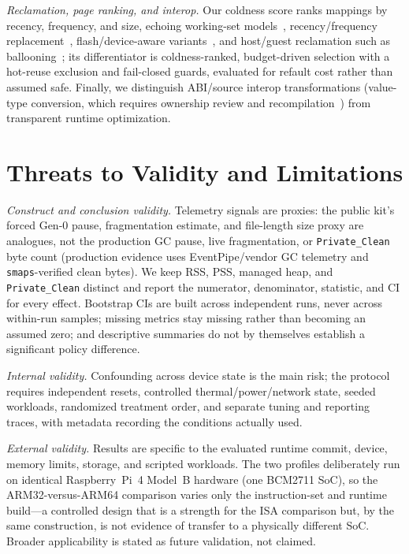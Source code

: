 \emph{Reclamation, page ranking, and interop.} Our coldness score ranks mappings
by recency, frequency, and size, echoing working-set
models~\cite{denning1968working}, recency/frequency
replacement~\cite{jiang2002lirs}, flash/device-aware
variants~\cite{park2006cflru}, and host/guest reclamation such as
ballooning~\cite{waldspurger2002esx}; its differentiator is coldness-ranked,
budget-driven selection with a hot-reuse exclusion and fail-closed guards,
evaluated for refault cost rather than assumed safe. Finally, we distinguish
ABI/source interop transformations (value-type conversion, which requires
ownership review and recompilation~\cite{xlang2018}) from transparent runtime
optimization.

\section{Threats to Validity and Limitations}
\label{sec:threats}
\label{sec:limitations}

\emph{Construct and conclusion validity.} Telemetry signals are proxies: the
public kit's forced Gen-0 pause, fragmentation estimate, and file-length size
proxy are analogues, not the production GC pause, live fragmentation, or
\texttt{Private\_Clean} byte count (production evidence uses EventPipe/vendor GC
telemetry and \texttt{smaps}-verified clean bytes). We keep RSS, PSS, managed
heap, and \texttt{Private\_Clean} distinct and report the numerator, denominator,
statistic, and CI for every effect. Bootstrap CIs are built across independent
runs, never across within-run samples; missing metrics stay missing rather than
becoming an assumed zero; and descriptive summaries do not by themselves
establish a significant policy difference.

\emph{Internal validity.} Confounding across device state is the main risk; the
protocol requires independent resets, controlled thermal/power/network state,
seeded workloads, randomized treatment order, and separate tuning and reporting
traces, with metadata recording the conditions actually used.

\emph{External validity.} Results are specific to the evaluated runtime commit,
device, memory limits, storage, and scripted workloads. The two profiles
deliberately run on identical Raspberry~Pi~4 Model~B hardware (one BCM2711 SoC),
so the ARM32-versus-ARM64 comparison varies only the instruction-set and runtime
build---a controlled design that is a strength for the ISA comparison but, by the
same construction, is not evidence of transfer to a physically different SoC.
Broader applicability is stated as future validation, not claimed.

